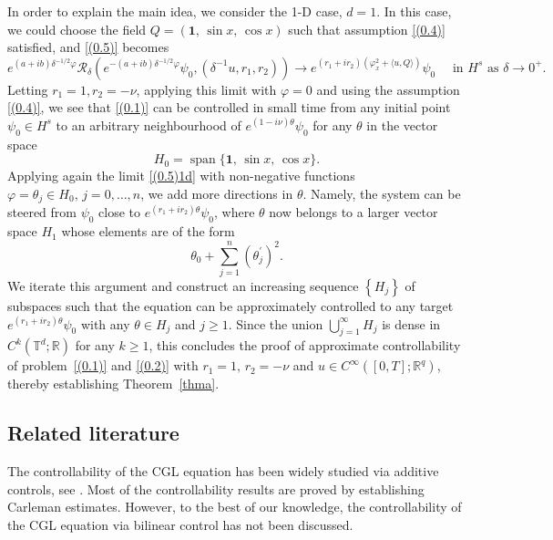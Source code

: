 \documentclass[review]{elsarticle}
\theoremstyle{dotless}
\def \geq{\geqslant}
\numberwithin{equation}{section}
\begin{document}
In order to explain the main idea, we consider the 1-D case, $d=1$. In this case, we could choose the field $Q=\left(\mathbf{1},\,\sin x,\,\cos x\right)$ such that assumption \eqref{(0.4)} satisfied, and \eqref{(0.5)} becomes 
\begin{equation}\label{(0.5)1d}
	e^{ (a+ib)\delta^{-1 / 2} \varphi} \mathcal{R}_\delta\left(e^{-(a+ib) \delta^{-1 / 2} \varphi} \psi_0, (\delta^{-1} u,r_1,r_2)\right) \rightarrow e^{(r_1+i r_2)\left( \varphi_x^2+\langle u, Q\rangle\right)} \psi_0  \quad \text { in } H^s \text { as } \delta \rightarrow 0^{+}.
\end{equation}
Letting $r_1=1,r_2=-\nu$, applying this limit with $\varphi=0$ and using the assumption \eqref{(0.4)}, we see that \eqref{(0.1)} can be controlled in small time from any initial point $\psi_0\in H^s$ to an arbitrary neighbourhood of $e^{(1-i\nu) \theta} \psi_0$ for any $\theta$ in the vector space
$$
H_0=\operatorname{span}\{\mathbf{1},\, \sin  x,\, \cos  x\}.
$$
Applying again the limit \eqref{(0.5)1d} with non-negative functions $\varphi=\theta_j \in H_0,\, j=0, \ldots, n$, we add more directions in $\theta$. Namely, the system can be steered from $\psi_0$ close to $e^{(r_1+ir_2) \theta} \psi_0$, where $\theta$ now belongs to a larger vector space $H_1$ whose elements are of the form
$$
\theta_0+\sum_{j=1}^n (\theta_j^\prime)^2.
$$
We iterate this argument and construct an increasing sequence $\left\{H_j\right\}$ of subspaces such that the equation can be approximately controlled to any target $e^{(r_1+ir_2) \theta} \psi_0$ with any $\theta \in H_j$ and $j \geq 1$. Since the union $\bigcup_{j=1}^{\infty} H_j$ is dense in $C^k\left(\mathbb{T}^d ; \mathbb{R}\right)$ for any $k \geq 1$, this concludes the proof of approximate controllability of problem~\eqref{(0.1)} and \eqref{(0.2)} with $r_1=1,\, r_2=-\nu$ and $u\in C^{\infty}\left([0, T] ; \mathbb{R}^{q}\right)$, thereby establishing Theorem~\ref{thma}.

\subsection{Related literature}
The controllability of the CGL equation has been widely studied via additive controls, see \cite{DFLZ_23,Fu_07,FuLiu_17,RZ_09}. Most of the controllability results are proved by establishing Carleman estimates.
However, to the best of our knowledge, the controllability of the CGL equation via bilinear control has not been discussed.
\end{document}
